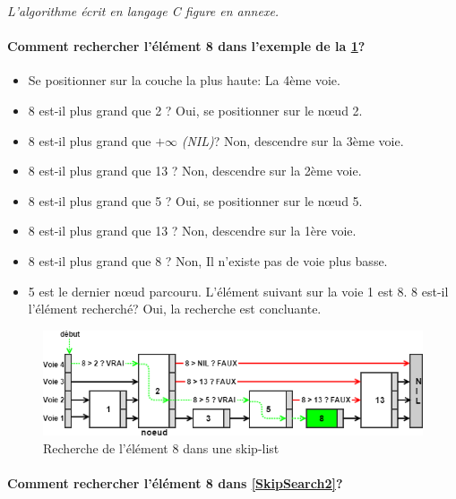 \documentclass[hidelinks,a4paper, 12pt]{article}
\begin{document}
	\emph{L'algorithme écrit en langage C figure en annexe.}
	
	\paragraph*{Comment rechercher l'élément 8 dans l'exemple de la \cref{SkipSearch1}?}
	\begin{itemize}
		\item Se positionner sur la couche la plus haute: La 4ème voie.
		\item 8 est-il plus grand que 2 ? Oui, se positionner sur le nœud 2.
		\item 8 est-il plus grand que $+\infty$ \textit{(NIL)}? Non, descendre sur la 3ème voie.
		\item 8 est-il plus grand que 13  ? Non, descendre sur la 2ème voie.
		\item 8 est-il plus grand que 5 ? Oui, se positionner sur le nœud 5.
		\item 8 est-il plus grand que 13 ? Non, descendre sur la 1ère voie.
		\item 8 est-il plus grand que 8 ? Non, Il n'existe pas de voie plus basse.
		\item 5 est le dernier nœud parcouru. L'élément suivant sur la voie 1 est 8. 8 est-il l'élément recherché? Oui, la recherche est concluante.
	\end{itemize}
	\begin{figure}[h]
		\includegraphics[width=\textwidth]{img/search}
		\caption{Recherche de l'élément 8 dans une skip-list}
		\label{SkipSearch1}
	\end{figure}
	
	\newpage
	\paragraph*{Comment rechercher l'élément 8 dans \cref{SkipSearch2}?}
	
\end{document}
